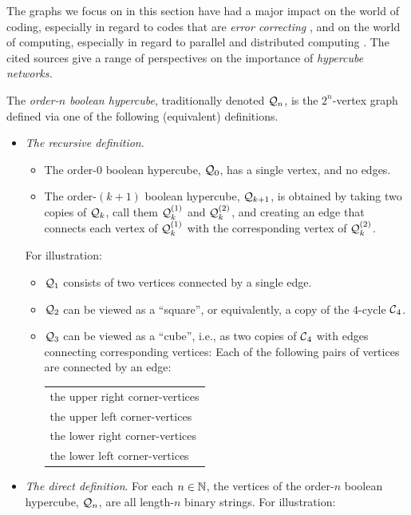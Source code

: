 The graphs we focus on in this section have had a major impact on the world of coding, especially in regard to codes that are {\em error correcting} \cite{PetersonW81}, and on the world of computing, especially in regard to parallel and distributed computing
\cite{JohnssonH1989, SaadS89, Schwartz80}.  The cited sources give a range of perspectives on the importance of {\it hypercube networks.}

The {\it order-$n$ boolean hypercube}, traditionally denoted $\mbox{$\cal Q$}_n$, is the $2^n$-vertex graph defined via one of the following (equivalent) definitions.
\begin{itemize}
\item
{\it The recursive definition}. 
  \begin{itemize}
  \item
The order-$0$ boolean hypercube, $\mbox{$\cal Q$}_0$, has a single vertex, and no edges.
  \medskip\item
The order-$(k+1)$ boolean hypercube, $\mbox{$\cal Q$}_{k+1}$, is obtained by taking two copies of $\mbox{$\cal Q$}_k$, call them $\mbox{$\cal Q$}_k^{(1)}$ and $\mbox{$\cal Q$}_k^{(2)}$, and creating an edge that connects each vertex of $\mbox{$\cal Q$}_k^{(1)}$ with the corresponding vertex of $\mbox{$\cal Q$}_k^{(2)}$.
  \end{itemize}
For illustration:
  \begin{itemize}
  \item
$\mbox{$\cal Q$}_1$ consists of two vertices connected by a single edge.
  \medskip\item
$\mbox{$\cal Q$}_2$ can be viewed as a ``square'', or equivalently, a copy of the $4$-cycle $\mbox{$\cal C$}_4$.
  \medskip\item
$\mbox{$\cal Q$}_3$ can be viewed as a ``cube'', i.e., as two copies of $\mbox{$\cal C$}_4$ with edges connecting corresponding vertices: Each of the following pairs of vertices are connected by an edge:

\smallskip

\hspace*{.25in}\begin{tabular}{l}
the upper right corner-vertices \\
the upper left corner-vertices \\
the lower right corner-vertices \\
the lower left corner-vertices
\end{tabular}
  \end{itemize}

\medskip\item
{\it The direct definition}.
For each $n \in \mathbb{N}$, the vertices of the order-$n$ boolean hypercube,
$\mbox{$\cal Q$}_n$, are all length-$n$ binary strings.  For illustration:


\end{itemize}
